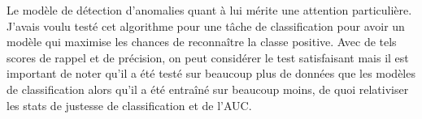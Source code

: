Le modèle de détection d'anomalies quant à lui mérite une attention particulière. J'avais voulu testé cet algorithme pour une tâche de classification pour avoir un modèle qui maximise les chances de reconnaître la classe positive. Avec de tels scores de rappel et de précision, on peut considérer le test satisfaisant mais il est important de noter qu'il a été testé sur beaucoup plus de données que les modèles de classification alors qu'il a été entraîné sur beaucoup moins, de quoi relativiser les stats de justesse de classification et de l'AUC.